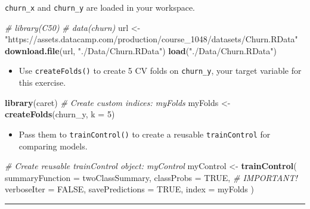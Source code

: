 \documentclass[]{book}
\newenvironment{Shaded}{\begin{snugshade}}{\end{snugshade}}
\newcommand{\KeywordTok}[1]{\textcolor[rgb]{0.13,0.29,0.53}{\textbf{#1}}}
\newcommand{\DataTypeTok}[1]{\textcolor[rgb]{0.13,0.29,0.53}{#1}}
\newcommand{\DecValTok}[1]{\textcolor[rgb]{0.00,0.00,0.81}{#1}}
\newcommand{\StringTok}[1]{\textcolor[rgb]{0.31,0.60,0.02}{#1}}
\newcommand{\CommentTok}[1]{\textcolor[rgb]{0.56,0.35,0.01}{\textit{#1}}}
\newcommand{\OtherTok}[1]{\textcolor[rgb]{0.56,0.35,0.01}{#1}}
\newcommand{\NormalTok}[1]{#1}
\providecommand{\tightlist}{%
  \setlength{\itemsep}{0pt}\setlength{\parskip}{0pt}}
\begin{document}
\texttt{churn\_x} and \texttt{churn\_y} are loaded in your workspace.

\begin{Shaded}
\begin{Highlighting}[]
\CommentTok{# library(C50)}
\CommentTok{# data(churn)}
\NormalTok{url <-}\StringTok{ "https://assets.datacamp.com/production/course_1048/datasets/Churn.RData"}
\KeywordTok{download.file}\NormalTok{(url, }\StringTok{"./Data/Churn.RData"}\NormalTok{)}
\KeywordTok{load}\NormalTok{(}\StringTok{"./Data/Churn.RData"}\NormalTok{)}
\end{Highlighting}
\end{Shaded}

\begin{itemize}
\tightlist
\item
  Use \texttt{createFolds()} to create 5 CV folds on \texttt{churn\_y},
  your target variable for this exercise.
\end{itemize}

\begin{Shaded}
\begin{Highlighting}[]
\KeywordTok{library}\NormalTok{(caret)}
\CommentTok{# Create custom indices: myFolds}
\NormalTok{myFolds <-}\StringTok{ }\KeywordTok{createFolds}\NormalTok{(churn_y, }\DataTypeTok{k =} \DecValTok{5}\NormalTok{)}
\end{Highlighting}
\end{Shaded}

\begin{itemize}
\tightlist
\item
  Pass them to \texttt{trainControl()} to create a reusable
  \texttt{trainControl} for comparing models.
\end{itemize}

\begin{Shaded}
\begin{Highlighting}[]
\CommentTok{# Create reusable trainControl object: myControl}
\NormalTok{myControl <-}\StringTok{ }\KeywordTok{trainControl}\NormalTok{(}
  \DataTypeTok{summaryFunction =}\NormalTok{ twoClassSummary,}
  \DataTypeTok{classProbs =} \OtherTok{TRUE}\NormalTok{, }\CommentTok{# IMPORTANT!}
  \DataTypeTok{verboseIter =} \OtherTok{FALSE}\NormalTok{,}
  \DataTypeTok{savePredictions =} \OtherTok{TRUE}\NormalTok{,}
  \DataTypeTok{index =}\NormalTok{ myFolds}
\NormalTok{)}
\end{Highlighting}
\end{Shaded}

\begin{center}\rule{0.5\linewidth}{\linethickness}\end{center}
\end{document}
